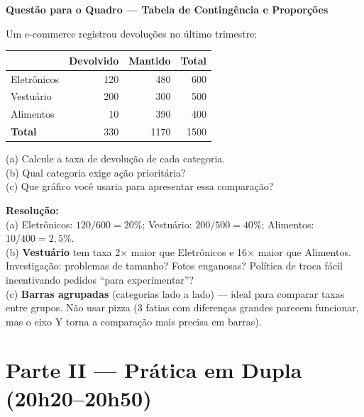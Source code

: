 \begin{SolvedBox}
\textbf{Questão para o Quadro — Tabela de Contingência e Proporções}

Um e-commerce registrou devoluções no último trimestre:

\begin{center}
\begin{tabular}{|l|r|r|r|}
\hline
& \textbf{Devolvido} & \textbf{Mantido} & \textbf{Total} \\
\hline
Eletrônicos  & 120 & 480 & 600 \\
Vestuário    & 200 & 300 & 500 \\
Alimentos    & 10  & 390 & 400 \\
\hline
\textbf{Total} & 330 & 1170 & 1500 \\
\hline
\end{tabular}
\end{center}

(a) Calcule a taxa de devolução de cada categoria.\\
(b) Qual categoria exige ação prioritária?\\
(c) Que gráfico você usaria para apresentar essa comparação?

\textbf{Resolução:}\\
(a) Eletrônicos: $120/600 = 20\%$; Vestuário: $200/500 = 40\%$;
Alimentos: $10/400 = 2{,}5\%$.\\
(b) \textbf{Vestuário} tem taxa 2$\times$ maior que Eletrônicos e
16$\times$ maior que Alimentos. Investigação: problemas de tamanho?
Fotos enganosas? Política de troca fácil incentivando pedidos ``para
experimentar''?\\
(c) \textbf{Barras agrupadas} (categorias lado a lado) — ideal para
comparar taxas entre grupos. Não usar pizza (3 fatias com diferenças
grandes parecem funcionar, mas o eixo Y torna a comparação mais
precisa em barras).
\end{SolvedBox}

\section{Parte II — Prática em Dupla (20h20–20h50)}

